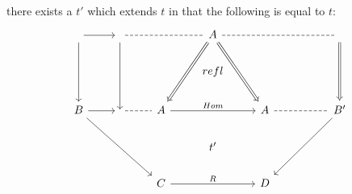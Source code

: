 \documentclass{article}
\begin{document}
there exists a $t'$ which extends $t$ in that the following is equal
to $t$:
\[%
\begin{tikzcd}
{} \arrow[dd] \arrow[r]  & {} \arrow[dd] \arrow[rr, no head, dashed] &                     & A \arrow[ldd, no head, Rightarrow] \arrow[rdd, no head, Rightarrow] \arrow[rrr, no head, dashed] &                               &  & {} \arrow[dd, no head, Rightarrow] \\
                         &                                           &                     & refl                                                                                             &                               &  &                                    \\
B \arrow[r] \arrow[rrdd] & {} \arrow[r, no head, dashed]             & A \arrow[rr, "Hom"] &                                                                                                  & A \arrow[rr, no head, dashed] &  & B' \arrow[lldd]                    \\
                         &                                           &                     & t'                                                                                               &                               &  &                                    \\
                         &                                           & C \arrow[rr, "R"]   &                                                                                                  & D                             &  &                                   
\end{tikzcd}\]
\end{document}
